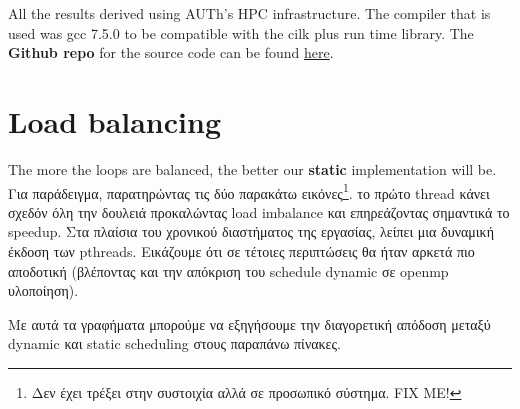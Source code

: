 \documentclass[12pt, a4paper]{article}
\begin{document}
\vspace{1cm}

All the results derived using AUTh's HPC infrastructure. The compiler that is used was gcc 7.5.0 to be compatible with the cilk plus run time library. The \textbf{Github repo} for the source code can be found \href{https://github.com/thodkatz/ece-triangle-counting}{here}.

\pagebreak
\section{Load balancing}


The more the loops are balanced, the better our \textbf{static} implementation will be. Για παράδειγμα, παρατηρώντας τις δύο παρακάτω εικόνες\footnote{Δεν έχει τρέξει στην συστοιχία αλλά σε προσωπικό σύστημα. FIX ME!}. το πρώτο thread κάνει σχεδόν όλη την δουλειά προκαλώντας load imbalance και επηρεάζοντας σημαντικά το speedup. Στα πλαίσια του χρονικού διαστήματος της εργασίας, λείπει μια δυναμική έκδοση των pthreads. Εικάζουμε ότι σε τέτοιες περιπτώσεις θα ήταν αρκετά πιο αποδοτική (βλέποντας και την απόκριση του schedule dynamic σε openmp υλοποίηση).

Με αυτά τα γραφήματα μπορούμε να εξηγήσουμε την διαγορετική απόδοση μεταξύ dynamic και static scheduling στους παραπάνω πίνακες.
\end{document}

